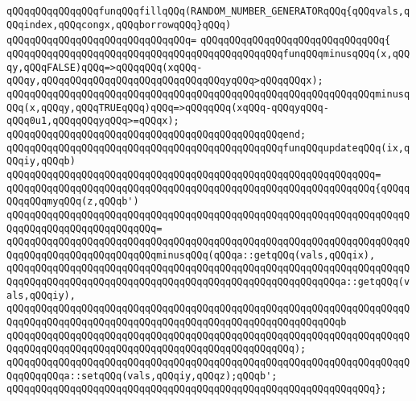 \newline
\verb|qQQqqQQqqQQqqQQqfunqQQqfillqQQq(RANDOM_NUMBER_GENERATORqQQq{qQQqvals,qQQqindex,qQQqcongx,qQQqborrowqQQq}qQQq)|\newline
\verb|qQQqqQQqqQQqqQQqqQQqqQQqqQQqqQQq=|\newline
\verb|qQQqqQQqqQQqqQQqqQQqqQQqqQQqqQQq{|\newline
\verb|qQQqqQQqqQQqqQQqqQQqqQQqqQQqqQQqqQQqqQQqqQQqqQQqfunqQQqminusqQQq(x,qQQqy,qQQqFALSE)qQQq=>qQQqqQQq(xqQQq-qQQqy,qQQqqQQqqQQqqQQqqQQqqQQqqQQqqQQqyqQQq>qQQqqQQqx);|\newline
\verb|qQQqqQQqqQQqqQQqqQQqqQQqqQQqqQQqqQQqqQQqqQQqqQQqqQQqqQQqqQQqqQQqminusqQQq(x,qQQqy,qQQqTRUEqQQq)qQQq=>qQQqqQQq(xqQQq-qQQqyqQQq-qQQq0u1,qQQqqQQqyqQQq>=qQQqx);|\newline
\verb|qQQqqQQqqQQqqQQqqQQqqQQqqQQqqQQqqQQqqQQqqQQqqQQqend;|\newline
\newline
\verb|qQQqqQQqqQQqqQQqqQQqqQQqqQQqqQQqqQQqqQQqqQQqqQQqfunqQQqupdateqQQq(ix,qQQqiy,qQQqb)|\newline
\verb|qQQqqQQqqQQqqQQqqQQqqQQqqQQqqQQqqQQqqQQqqQQqqQQqqQQqqQQqqQQqqQQq=|\newline
\verb|qQQqqQQqqQQqqQQqqQQqqQQqqQQqqQQqqQQqqQQqqQQqqQQqqQQqqQQqqQQqqQQq{qQQqqQQqqQQqmyqQQq(z,qQQqb')|\newline
\verb|qQQqqQQqqQQqqQQqqQQqqQQqqQQqqQQqqQQqqQQqqQQqqQQqqQQqqQQqqQQqqQQqqQQqqQQqqQQqqQQqqQQqqQQqqQQqqQQq=|\newline
\verb|qQQqqQQqqQQqqQQqqQQqqQQqqQQqqQQqqQQqqQQqqQQqqQQqqQQqqQQqqQQqqQQqqQQqqQQqqQQqqQQqqQQqqQQqqQQqqQQqminusqQQq(qQQqa::getqQQq(vals,qQQqix),|\newline
\verb|qQQqqQQqqQQqqQQqqQQqqQQqqQQqqQQqqQQqqQQqqQQqqQQqqQQqqQQqqQQqqQQqqQQqqQQqqQQqqQQqqQQqqQQqqQQqqQQqqQQqqQQqqQQqqQQqqQQqqQQqqQQqqQQqa::getqQQq(vals,qQQqiy),|\newline
\verb|qQQqqQQqqQQqqQQqqQQqqQQqqQQqqQQqqQQqqQQqqQQqqQQqqQQqqQQqqQQqqQQqqQQqqQQqqQQqqQQqqQQqqQQqqQQqqQQqqQQqqQQqqQQqqQQqqQQqqQQqqQQqqQQqb|\newline
\verb|qQQqqQQqqQQqqQQqqQQqqQQqqQQqqQQqqQQqqQQqqQQqqQQqqQQqqQQqqQQqqQQqqQQqqQQqqQQqqQQqqQQqqQQqqQQqqQQqqQQqqQQqqQQqqQQqqQQqqQQq);|\newline
\newline
\verb|qQQqqQQqqQQqqQQqqQQqqQQqqQQqqQQqqQQqqQQqqQQqqQQqqQQqqQQqqQQqqQQqqQQqqQQqqQQqqQQqa::setqQQq(vals,qQQqiy,qQQqz);qQQqb';|\newline
\verb|qQQqqQQqqQQqqQQqqQQqqQQqqQQqqQQqqQQqqQQqqQQqqQQqqQQqqQQqqQQqqQQq};|\newline
